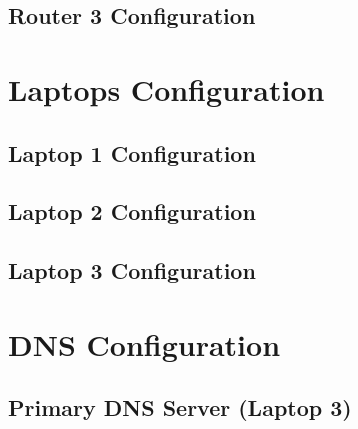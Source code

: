 \section{Router 3 Configuration}
\label{app:sec:router3}




\chapter{Laptops Configuration}
\label{app:laptops}


\section{Laptop 1 Configuration}
\label{app:sec:laptop1}

\clearpage

\section{Laptop 2 Configuration}
\label{app:sec:laptop2}

\clearpage

\section{Laptop 3 Configuration}
\label{app:sec:laptop3}



\chapter{DNS Configuration}
\label{app:dns}

\section{Primary DNS Server (Laptop 3)}


